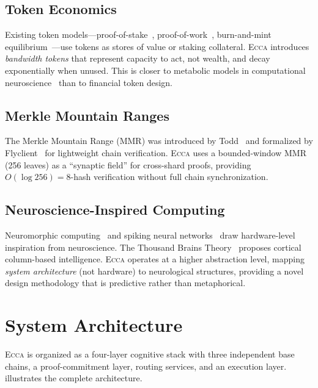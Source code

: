 \documentclass[11pt,twocolumn]{article}
\theoremstyle{definition}
\theoremstyle{plain}
\theoremstyle{remark}
\newcommand{\ecca}{\textsc{Ecca}}
\begin{document}
\subsection{Token Economics}

Existing token models---proof-of-stake~\cite{buterin2020pos}, proof-of-work~\cite{nakamoto2008bitcoin}, burn-and-mint equilibrium~\cite{samani2018burn}---use tokens as stores of value or staking collateral. \ecca{} introduces \emph{bandwidth tokens} that represent capacity to act, not wealth, and decay exponentially when unused. This is closer to metabolic models in computational neuroscience~\cite{attwell2001energy} than to financial token design.

\subsection{Merkle Mountain Ranges}

The Merkle Mountain Range (MMR) was introduced by Todd~\cite{todd2012mmr} and formalized by Flyclient~\cite{bunz2020flyclient} for lightweight chain verification. \ecca{} uses a bounded-window MMR (256 leaves) as a ``synaptic field'' for cross-shard proofs, providing $O(\log 256) = 8$-hash verification without full chain synchronization.

\subsection{Neuroscience-Inspired Computing}

Neuromorphic computing~\cite{davies2018loihi,merolla2014truenorth} and spiking neural networks~\cite{maass1997networks} draw hardware-level inspiration from neuroscience. The Thousand Brains Theory~\cite{hawkins2019thousand} proposes cortical column-based intelligence. \ecca{} operates at a higher abstraction level, mapping \emph{system architecture} (not hardware) to neurological structures, providing a novel design methodology that is predictive rather than metaphorical.

\section{System Architecture}\label{sec:architecture}

\ecca{} is organized as a four-layer cognitive stack with three independent base chains, a proof-commitment layer, routing services, and an execution layer.  illustrates the complete architecture.
\end{document}
